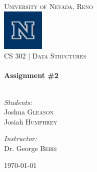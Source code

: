 \begin{titlepage}
	\begin{center}

		\textsc{\LARGE University of Nevada, Reno}\\[.5cm]
		\includegraphics[width=0.15\textwidth]{./logo.png}\\[.5cm]

		\textsc{\large CS 302 | Data Structures } \\[.5cm]

		\HRule \\[0.4cm]
		{ \huge \bfseries Assignment \#2}\\[0.4cm]

		\HRule \\[1.5cm]

		\begin{minipage}{0.4\textwidth}
			\begin{flushleft} \large
				\emph{Students:}\\
				Joshua \textsc{Gleason}\\
				Josiah \textsc{Humphrey}
			\end{flushleft}
		\end{minipage}
		\begin{minipage}{0.4\textwidth}
			\begin{flushright} \large
				\emph{Instructor:} \\
				Dr. George \textsc{Bebis}
			\end{flushright}
		\end{minipage}

		\vfill

		{\large \today}

	\end{center}

\end{titlepage}
